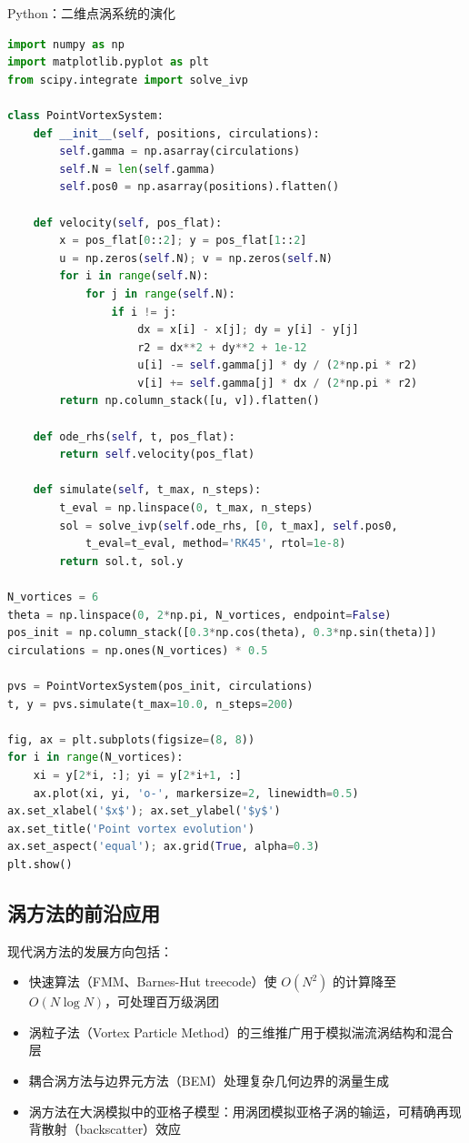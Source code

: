 \begin{mycode}{Python：二维点涡系统的演化}
\begin{lstlisting}[language=Python]
import numpy as np
import matplotlib.pyplot as plt
from scipy.integrate import solve_ivp

class PointVortexSystem:
    def __init__(self, positions, circulations):
        self.gamma = np.asarray(circulations)
        self.N = len(self.gamma)
        self.pos0 = np.asarray(positions).flatten()
    
    def velocity(self, pos_flat):
        x = pos_flat[0::2]; y = pos_flat[1::2]
        u = np.zeros(self.N); v = np.zeros(self.N)
        for i in range(self.N):
            for j in range(self.N):
                if i != j:
                    dx = x[i] - x[j]; dy = y[i] - y[j]
                    r2 = dx**2 + dy**2 + 1e-12
                    u[i] -= self.gamma[j] * dy / (2*np.pi * r2)
                    v[i] += self.gamma[j] * dx / (2*np.pi * r2)
        return np.column_stack([u, v]).flatten()
    
    def ode_rhs(self, t, pos_flat):
        return self.velocity(pos_flat)
    
    def simulate(self, t_max, n_steps):
        t_eval = np.linspace(0, t_max, n_steps)
        sol = solve_ivp(self.ode_rhs, [0, t_max], self.pos0,
            t_eval=t_eval, method='RK45', rtol=1e-8)
        return sol.t, sol.y

N_vortices = 6
theta = np.linspace(0, 2*np.pi, N_vortices, endpoint=False)
pos_init = np.column_stack([0.3*np.cos(theta), 0.3*np.sin(theta)])
circulations = np.ones(N_vortices) * 0.5

pvs = PointVortexSystem(pos_init, circulations)
t, y = pvs.simulate(t_max=10.0, n_steps=200)

fig, ax = plt.subplots(figsize=(8, 8))
for i in range(N_vortices):
    xi = y[2*i, :]; yi = y[2*i+1, :]
    ax.plot(xi, yi, 'o-', markersize=2, linewidth=0.5)
ax.set_xlabel('$x$'); ax.set_ylabel('$y$')
ax.set_title('Point vortex evolution')
ax.set_aspect('equal'); ax.grid(True, alpha=0.3)
plt.show()
\end{lstlisting}
\end{mycode}

\subsection{涡方法的前沿应用}

现代涡方法的发展方向包括：
\begin{itemize}
    \item 快速算法（FMM、Barnes-Hut treecode）使 $O(N^{2})$ 的计算降至 $O(N\log N)$，可处理百万级涡团
    \item 涡粒子法（Vortex Particle Method）的三维推广用于模拟湍流涡结构和混合层
    \item 耦合涡方法与边界元方法（BEM）处理复杂几何边界的涡量生成
    \item 涡方法在大涡模拟中的亚格子模型：用涡团模拟亚格子涡的输运，可精确再现背散射（backscatter）效应
\end{itemize}

